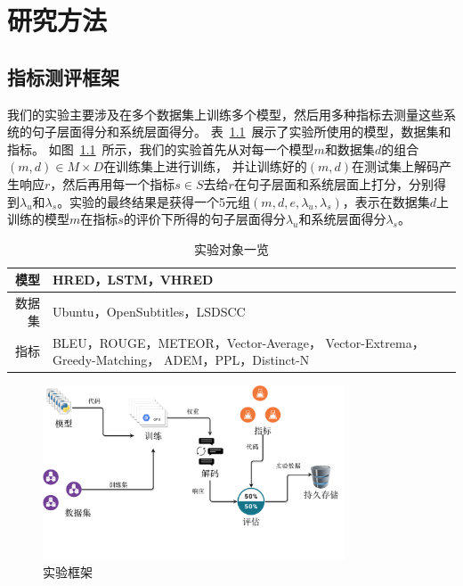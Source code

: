 
\chapter{研究方法}\label{ch:method}

\section{指标测评框架}\label{sec:eval_framework}
我们的实验主要涉及在多个数据集上训练多个模型，然后用多种指标去测量这些系统的句子层面得分和系统层面得分。
表~\ref{tab:experiment_triples}~展示了实验所使用的模型，数据集和指标。
如图~\ref{fig:framework}~所示，我们的实验首先从对每一个模型$m$和数据集$d$的组合$(m, d) \in M \times D$在训练集上进行训练，
并让训练好的$(m, d)$在测试集上解码产生响应$r$，然后再用每一个指标$s \in S$去给$r$在句子层面和系统层面上打分，分别得到$\lambda_{u}$和$\lambda_{s}$。实验的最终结果是获得一个5元组$(m, d, e, \lambda_{u}, \lambda_{s})$，表示在数据集$d$上训练的模型$m$在指标$s$的评价下所得的句子层面得分$\lambda_u$和系统层面得分$\lambda_s$。


\begin{table}[H]
    \centering
    \caption{实验对象一览}
    \label{tab:experiment_triples}
    \begin{tabular}{|r|m{}|}
        \hline
        模型 & HRED，LSTM，VHRED \\
        \hline
        数据集 & Ubuntu，OpenSubtitles，LSDSCC \\
        \hline
        指标 & BLEU，ROUGE，METEOR，Vector-Average，
        Vector-Extrema，Greedy-Matching，
        ADEM，PPL，Distinct-N \\
        \hline
    \end{tabular}
\end{table}

\begin{figure}[H]
    \centering
    \includegraphics[width=0.8\textwidth]{figure/drawio/eval_v3.pdf}
    \caption{实验框架}
    \label{fig:framework}
\end{figure}

